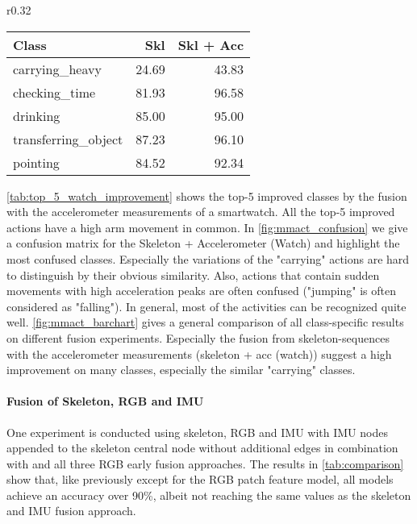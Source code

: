 \begin{wraptable}[10]{r}{0.32\textwidth}
    \centering
    \scriptsize
    \vspace{-3.0\baselineskip}
    \begin{tabular}{l|r|r}
    \hline
        \textbf{Class} & \textbf{Skl} &	\textbf{Skl + Acc} \\
        \hline
        carrying\_heavy &	24.69 & 43.83 \\
        checking\_time &	81.93 & 96.58 \\ 
        drinking &	85.00 & 95.00 \\
        transferring\_object &	87.23	& 96.10 \\
        pointing &	84.52 & 92.34 \\
        \hline
    \end{tabular}
    \caption{Top-5 most improved classes by the fusion of skeleton (Skl) and additional accelerometer (Acc) data from the smartwatch.}
    \label{tab:top_5_watch_improvement}
\end{wraptable}
\tabname \ref{tab:top_5_watch_improvement} shows the top-5 improved classes by the fusion with the accelerometer measurements of a smartwatch. All the top-5 improved actions have a high arm movement in common. In \figname \ref{fig:mmact_confusion} we give a confusion matrix for the Skeleton + Accelerometer (Watch) and highlight the most confused classes. Especially the variations of the "carrying" actions are hard to distinguish by their obvious similarity. Also, actions that contain sudden movements with high acceleration peaks are often confused ("jumping" is often considered as "falling"). In general, most of the activities can be recognized quite well.
\figname \ref{fig:mmact_barchart} gives a general comparison of all class-specific results on different fusion experiments. Especially the fusion from skeleton-sequences with the accelerometer measurements (skeleton + acc (watch)) suggest a high improvement on many classes, especially the similar "carrying" classes.










\paragraph{Fusion of Skeleton, RGB and IMU}



One experiment is conducted using skeleton, RGB and IMU with IMU nodes appended to the skeleton central node without additional edges in combination with and all three RGB early fusion approaches.
The results in \tabname\ref{tab:comparison} show that, like previously except for the RGB patch feature model, all models achieve an accuracy over 90\%, albeit not reaching the same values as the skeleton and IMU fusion approach.















